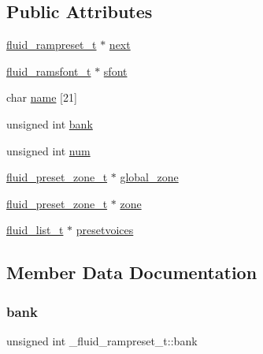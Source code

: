 \subsection*{Public Attributes}
\begin{DoxyCompactItemize}
\item 
\hyperlink{types_8h_a8bbeb200df523c6e0e0e86c605b7b98a}{fluid\+\_\+rampreset\+\_\+t} $\ast$ \hyperlink{struct__fluid__rampreset__t_ae30f7d7f179a39650237abbc5bba2da0}{next}
\item 
\hyperlink{types_8h_a093fe32472dd43adaef22c62feb2d15e}{fluid\+\_\+ramsfont\+\_\+t} $\ast$ \hyperlink{struct__fluid__rampreset__t_a96888a85aa777e9e89e7696cc8bd9947}{sfont}
\item 
char \hyperlink{struct__fluid__rampreset__t_a8ce6d30bb670226a2bd7f418c2fe773b}{name} \mbox{[}21\mbox{]}
\item 
unsigned int \hyperlink{struct__fluid__rampreset__t_a7904484cd36ec879a31aaab90886d95b}{bank}
\item 
unsigned int \hyperlink{struct__fluid__rampreset__t_a1f87bb3a634eb622a3c8f11b06f88708}{num}
\item 
\hyperlink{fluid__defsfont_8h_a74cb7075332911049d39e60df50019b2}{fluid\+\_\+preset\+\_\+zone\+\_\+t} $\ast$ \hyperlink{struct__fluid__rampreset__t_a662bbc3be7bcc34dc520ab992e5f8448}{global\+\_\+zone}
\item 
\hyperlink{fluid__defsfont_8h_a74cb7075332911049d39e60df50019b2}{fluid\+\_\+preset\+\_\+zone\+\_\+t} $\ast$ \hyperlink{struct__fluid__rampreset__t_aa2c9ac5d07d1c5cc309f830cabbe4ffd}{zone}
\item 
\hyperlink{fluid__list_8h_a3ef7535d4290862c0af118569223bd89}{fluid\+\_\+list\+\_\+t} $\ast$ \hyperlink{struct__fluid__rampreset__t_a3df2cef0a7f82e89bc49e68150e97658}{presetvoices}
\end{DoxyCompactItemize}


\subsection{Member Data Documentation}
\mbox{\label{struct__fluid__rampreset__t_a7904484cd36ec879a31aaab90886d95b}} 
\subsubsection{\texorpdfstring{bank}{bank}}
{\footnotesize\ttfamily unsigned int \+\_\+fluid\+\_\+rampreset\+\_\+t\+::bank}

